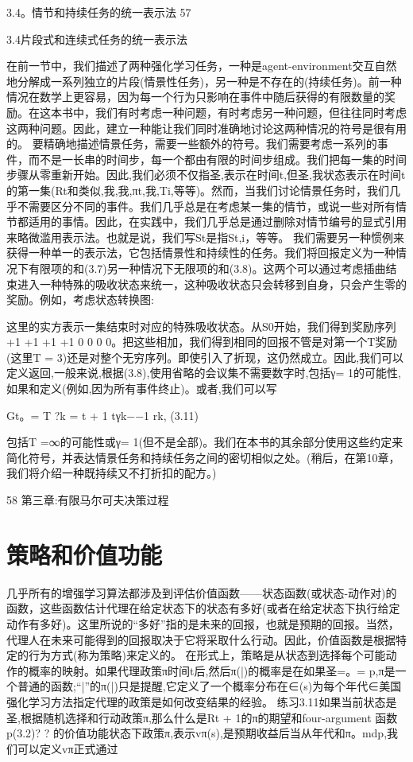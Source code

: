 3.4。情节和持续任务的统一表示法 					57


3.4片段式和连续式任务的统一表示法

在前一节中，我们描述了两种强化学习任务，一种是agent-environment交互自然地分解成一系列独立的片段(情景性任务)，另一种是不存在的(持续任务)。前一种情况在数学上更容易，因为每一个行为只影响在事件中随后获得的有限数量的奖励。在这本书中，我们有时考虑一种问题，有时考虑另一种问题，但往往同时考虑这两种问题。因此，建立一种能让我们同时准确地讨论这两种情况的符号是很有用的。
要精确地描述情景任务，需要一些额外的符号。我们需要考虑一系列的事件，而不是一长串的时间步，每一个都由有限的时间步组成。我们把每一集的时间步骤从零重新开始。因此,我们必须不仅指圣,表示在时间t,但圣,我状态表示在时间t的第一集(Rt和类似,我,我,πt,我,Ti,等等)。然而，当我们讨论情景任务时，我们几乎不需要区分不同的事件。我们几乎总是在考虑某一集的情节，或说一些对所有情节都适用的事情。因此，在实践中，我们几乎总是通过删除对情节编号的显式引用来略微滥用表示法。也就是说，我们写St是指St,i，等等。
我们需要另一种惯例来获得一种单一的表示法，它包括情景性和持续性的任务。我们将回报定义为一种情况下有限项的和(3.7)另一种情况下无限项的和(3.8)。这两个可以通过考虑插曲结束进入一种特殊的吸收状态来统一，这种吸收状态只会转移到自身，只会产生零的奖励。例如，考虑状态转换图:



这里的实方表示一集结束时对应的特殊吸收状态。从S0开始，我们得到奖励序列+1 +1 +1 +1 0 0 0 0。把这些相加，我们得到相同的回报不管是对第一个T奖励(这里T = 3)还是对整个无穷序列。即使引入了折现，这仍然成立。因此,我们可以定义返回,一般来说,根据(3.8),使用省略的会议集不需要数字时,包括γ= 1的可能性,如果和定义(例如,因为所有事件终止)。或者,我们可以写


Gt。=
T ?k = t + 1
tγk−−1 rk, 					(3.11)

包括T =∞的可能性或γ= 1(但不是全部)。我们在本书的其余部分使用这些约定来简化符号，并表达情景任务和持续任务之间的密切相似之处。(稍后，在第10章，我们将介绍一种既持续又不打折扣的配方。)

58 					第三章:有限马尔可夫决策过程


\section{策略和价值功能}

几乎所有的增强学习算法都涉及到评估价值函数——状态函数(或状态-动作对)的函数，这些函数估计代理在给定状态下的状态有多好(或者在给定状态下执行给定动作有多好)。这里所说的“多好”指的是未来的回报，也就是预期的回报。当然，代理人在未来可能得到的回报取决于它将采取什么行动。因此，价值函数是根据特定的行为方式(称为策略)来定义的。
在形式上，策略是从状态到选择每个可能动作的概率的映射。如果代理政策π时间t后,然后π(|)的概率是在如果圣=。= p,π是一个普通的函数;“|”的π(|)只是提醒,它定义了一个概率分布在∈(s)为每个年代∈美国强化学习方法指定代理的政策是如何改变结果的经验。
练习3.11如果当前状态是圣,根据随机选择和行动政策π,那么什么是Rt + 1的π的期望和four-argument
函数p(3.2)? 					?
的价值功能状态下政策π,表示vπ(s),是预期收益后当从年代和π。mdp,我们可以定义vπ正式通过


